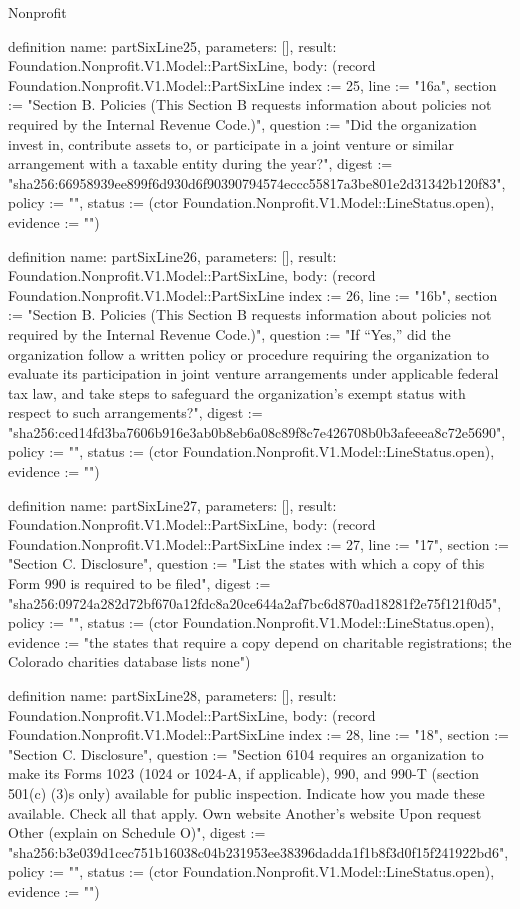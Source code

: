 \begin{lexlean}{Nonprofit}
\begin{semanticmodule}
definition{
  name: partSixLine25,
  parameters: [],
  result: Foundation.Nonprofit.V1.Model::PartSixLine,
  body: (record Foundation.Nonprofit.V1.Model::PartSixLine {index := 25, line := "16a", section := "Section B. Policies (This Section B requests information about policies not required by the Internal Revenue Code.)", question := "Did the organization invest in, contribute assets to, or participate in a joint venture or similar arrangement with a taxable entity during the year?", digest := "sha256:66958939ee899f6d930d6f90390794574eccc55817a3be801e2d31342b120f83", policy := "", status := (ctor Foundation.Nonprofit.V1.Model::LineStatus.open), evidence := ""})
}

definition{
  name: partSixLine26,
  parameters: [],
  result: Foundation.Nonprofit.V1.Model::PartSixLine,
  body: (record Foundation.Nonprofit.V1.Model::PartSixLine {index := 26, line := "16b", section := "Section B. Policies (This Section B requests information about policies not required by the Internal Revenue Code.)", question := "If “Yes,” did the organization follow a written policy or procedure requiring the organization to evaluate its participation in joint venture arrangements under applicable federal tax law, and take steps to safeguard the organization’s exempt status with respect to such arrangements?", digest := "sha256:ced14fd3ba7606b916e3ab0b8eb6a08c89f8c7e426708b0b3afeeea8c72e5690", policy := "", status := (ctor Foundation.Nonprofit.V1.Model::LineStatus.open), evidence := ""})
}

definition{
  name: partSixLine27,
  parameters: [],
  result: Foundation.Nonprofit.V1.Model::PartSixLine,
  body: (record Foundation.Nonprofit.V1.Model::PartSixLine {index := 27, line := "17", section := "Section C. Disclosure", question := "List the states with which a copy of this Form 990 is required to be filed", digest := "sha256:09724a282d72bf670a12fdc8a20ce644a2af7bc6d870ad18281f2e75f121f0d5", policy := "", status := (ctor Foundation.Nonprofit.V1.Model::LineStatus.open), evidence := "the states that require a copy depend on charitable registrations; the Colorado charities database lists none"})
}

definition{
  name: partSixLine28,
  parameters: [],
  result: Foundation.Nonprofit.V1.Model::PartSixLine,
  body: (record Foundation.Nonprofit.V1.Model::PartSixLine {index := 28, line := "18", section := "Section C. Disclosure", question := "Section 6104 requires an organization to make its Forms 1023 (1024 or 1024-A, if applicable), 990, and 990-T (section 501(c) (3)s only) available for public inspection. Indicate how you made these available. Check all that apply. Own website Another’s website Upon request Other (explain on Schedule O)", digest := "sha256:b3e039d1cec751b16038c04b231953ee38396dadda1f1b8f3d0f15f241922bd6", policy := "", status := (ctor Foundation.Nonprofit.V1.Model::LineStatus.open), evidence := ""})
}


\end{semanticmodule}
\end{lexlean}
